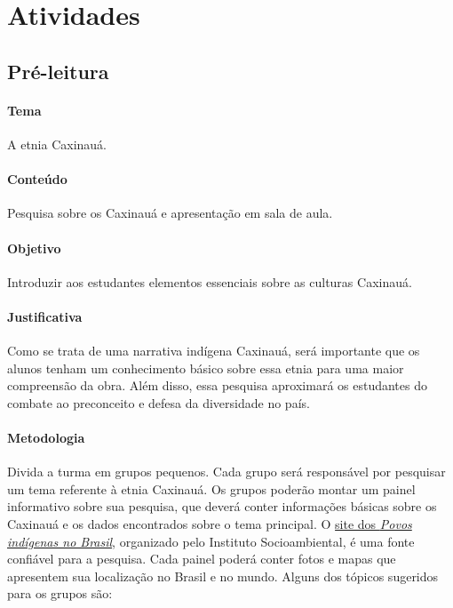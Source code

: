\documentclass[11pt]{extarticle}
\begin{document}
\section{Atividades}

\subsection{Pré-leitura}


\paragraph{Tema} A etnia Caxinauá.

\paragraph{Conteúdo} Pesquisa sobre os Caxinauá e apresentação em sala de aula.

\paragraph{Objetivo} Introduzir aos estudantes elementos essenciais sobre as culturas Caxinauá.

\paragraph{Justificativa} Como se trata de uma narrativa indígena Caxinauá, será importante que os alunos tenham um conhecimento básico sobre essa etnia para uma maior compreensão da obra. Além disso, essa pesquisa aproximará os estudantes do combate ao preconceito e defesa da diversidade no país.


\paragraph{Metodologia} Divida a turma em grupos pequenos. Cada grupo será responsável por pesquisar um tema referente à etnia Caxinauá. Os grupos poderão montar um painel informativo sobre sua pesquisa, que deverá conter informações básicas sobre os Caxinauá e os dados encontrados sobre o tema principal. O \href{https://pib.socioambiental.org/pt/Povo:Huni_Kuin_(Kaxinaw\%C3\%A1)}{site dos \textit{Povos indígenas no Brasil}}, organizado pelo Instituto Socioambiental, é uma fonte confiável para a pesquisa. Cada painel poderá conter fotos e mapas que apresentem sua localização no Brasil e no mundo. Alguns dos tópicos sugeridos para os grupos são:
\end{document}
